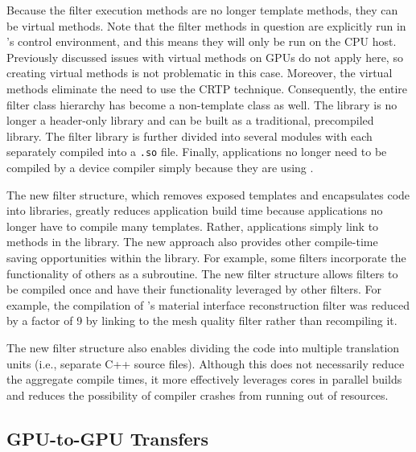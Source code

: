 Because the filter execution methods are no longer template methods, they can be virtual methods.
Note that the filter methods in question are explicitly run in \vtkm's control environment, and this means they will only be run on the CPU host.
Previously discussed issues with virtual methods on GPUs do not apply here, so creating virtual methods is not problematic in this case.
Moreover, the virtual methods eliminate the need to use the CRTP technique.
Consequently, the entire filter class hierarchy has become a non-template class as well.
The library is no longer a header-only library and can be built as a traditional, precompiled library.
The filter library is further divided into several modules with each separately compiled into a \texttt{.so} file.
Finally, applications no longer need to be compiled by a device compiler simply because they are using \vtkm.

The new filter structure, which removes exposed templates and encapsulates code into libraries, greatly reduces application build time because applications no longer have to compile many \vtkm templates.
Rather, applications simply link to methods in the \vtkm library.
The new approach also provides other compile-time saving opportunities within the library.
For example, some filters incorporate the functionality of others as a subroutine.
The new filter structure allows filters to be compiled once and have their functionality leveraged by other filters.
For example, the compilation of \vtkm's material interface reconstruction filter was reduced by a factor of 9 by linking to the mesh quality filter rather than recompiling it.

The new filter structure also enables dividing the code into multiple translation units (i.e., separate C++ source files).
Although this does not necessarily reduce the aggregate compile times, it more effectively leverages cores in parallel builds and reduces the possibility of compiler crashes from running out of resources.

\subsection{GPU-to-GPU Transfers}

